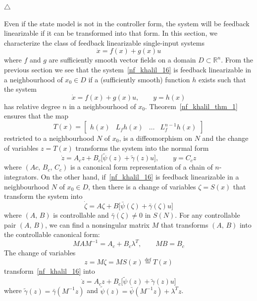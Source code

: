 \documentclass[12pt,a4paper,oneside]{book}
\begin{document}
\begin{onehalfspace}
\begin{example}
		\hfill $\triangle$
\end{example}
Even if the state model is not in the controller form, the system will be feedback linearizable if it can be transformed into that form. In this section, we characterize the class of feedback linearizable single-input systems
\begin{equation}\label{nf_khalil_16}
	\dot{x}=f(x)+g(x)u
\end{equation}
where $f$ and $g$ are sufficiently smooth vector fields on a domain $D\subset\mathbb{R}^n$. From the previous section we see that the system~\eqref{nf_khalil_16} is feedback linearizable in a neighbourhood of $x_0\in D$ if a (sufficiently smooth) function $h$ exists such that the system
 \begin{equation}\label{nf_khalil_17}
 	\dot{x}=f(x)+g(x)u,\qquad y=h(x)
 \end{equation}
has relative degree $n$ in a neighbourhood of $x_0$. Theorem~\ref{nf_khalil_thm_1} ensures that the map 
\begin{equation*}
	T(x)=\begin{bmatrix} h(x) & L_fh(x) & \dots & L_f^{n-1}h(x)	\end{bmatrix}
\end{equation*}
restricted to a neighbourhood $N$ of $x_0$, is a diffeomorphism on $N$ and the change of variables $z=T(x)$ transforms the system into the normal form
\begin{equation*}
	\dot{z}=A_cz+B_c\Big[\tilde{\psi}(z) + \tilde{\gamma}(z)u\Big],\qquad y=C_cz
\end{equation*}
where $(Ac,\,B_c,\,C_c)$ is a canonical form representation of a chain of $n$-integrators. On the other hand, if~\eqref{nf_khalil_16} is feedback linearizable in a neighbourhood $N$ of $x_0\in D$, then there is a change of variables $\zeta=S(x)$ that transform the system into 
\begin{equation*}
	\dot{\zeta}=A\zeta+B\Big[\bar{\psi}(\zeta)+\bar{\gamma}(\zeta)u\Big]
\end{equation*}
where $(A,\,B)$ is controllable and $\bar{\gamma}(\zeta)\ne0$ in $S(N)$. For any controllable pair $(A,\,B)$, we can find a nonsingular matrix $M$ that transforms $(A,\,B)$ into the controllable canonical form:
\begin{equation*}
	MAM^{-1}=A_c+B_c\lambda^T,\qquad MB=B_c
\end{equation*}
The change of variables 
\begin{equation*}
	z=M\zeta=MS(x)\stackrel{\text{def}}{=}T(x)
\end{equation*}
transform~\eqref{nf_khalil_16} into
\begin{equation*}
	\dot{z} = A_cz+B_c\Big[\tilde{\psi}(z)+\tilde{\gamma}(z)u\Big]
\end{equation*}
where $\tilde{\gamma}(z)=\bar{\gamma}(M^{-1}z)$ and $\tilde{\psi}(z)=\bar{\psi}(M^{-1}z)+\lambda^Tz$.


\end{onehalfspace}
\end{document}
